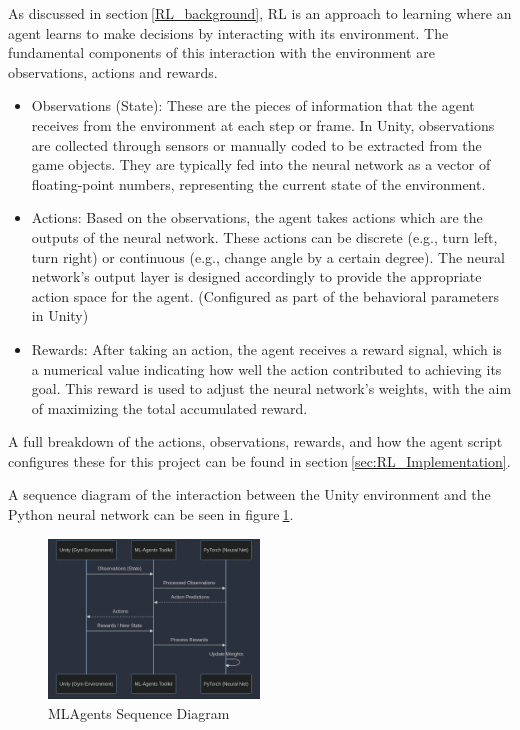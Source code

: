 As discussed in section$~$\ref{RL_background}, RL is an approach to learning where an agent learns to make decisions by interacting with its environment. The fundamental components of this interaction with the environment are observations, actions and rewards.
\begin{itemize}
    \item Observations (State): These are the pieces of information that the agent receives from the environment at each step or frame. In Unity, observations are collected through sensors or manually coded to be extracted from the game objects. They are typically fed into the neural network as a vector of floating-point numbers, representing the current state of the environment.
    \item Actions: Based on the observations, the agent takes actions which are the outputs of the neural network. These actions can be discrete (e.g., turn left, turn right) or continuous (e.g., change angle by a certain degree). The neural network's output layer is designed accordingly to provide the appropriate action space for the agent. (Configured as part of the behavioral parameters in Unity)
    \item Rewards: After taking an action, the agent receives a reward signal, which is a numerical value indicating how well the action contributed to achieving its goal. This reward is used to adjust the neural network's weights, with the aim of maximizing the total accumulated reward.
\end{itemize}
A full breakdown of the actions, observations, rewards, and how the agent script configures these for this project can be found in section$~$\ref{sec:RL_Implementation}.

A sequence diagram of the interaction between the Unity environment and the Python neural network can be seen in figure$~$\ref{MLAgents_Seq_Diagram}.

\begin{figure}[h]
    \centering
    \includegraphics[width=0.5\textwidth]{Images/MLAgents_Seq_Diagram.png}
    \caption{MLAgents Sequence Diagram}\label{MLAgents_Seq_Diagram}
\end{figure}

